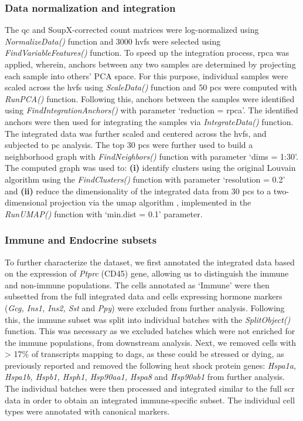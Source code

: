 \subsubsection{\large Data normalization and integration}
The \gls{qc} and SoupX-corrected count matrices were log-normalized using \textit{NormalizeData()} function and 3000 \glspl{hvf} were selected using \textit{FindVariableFeatures()} function. To speed up the integration process, \gls{rpca} was applied, wherein, anchors between any two samples are determined by projecting each sample into others’ PCA space. For this purpose, individual samples were scaled across the \glspl{hvf} using \textit{ScaleData()} function and 50 \glspl{pc} were computed with \textit{RunPCA()} function. Following this, anchors between the samples were identified using \textit{FindIntegrationAnchors()} with parameter `reduction = rpca’. The identified anchors were then used for integrating the samples via \textit{IntegrateData()} function. The integrated data was further scaled and centered across the \glspl{hvf}, and subjected to \gls{pc} analysis. The top 30 \glspl{pc} were further used to build a neighborhood graph with \textit{FindNeighbors()} function with parameter `dims = 1:30'. The computed graph was used to: \textbf{(i)} identify clusters using the original Louvain algorithm \textbf{\cite{blondel_fast_2008}} using the \textit{FindClusters()} function with parameter `resolution = 0.2' and \textbf{(ii)} reduce the dimensionality of the integrated data from 30 \glspl{pc} to a two-dimensional projection via the \gls{umap} algorithm \textbf{\cite{mcinnes_umap_2018}}, implemented in the \textit{RunUMAP()} function with `min.dist = 0.1' parameter.  


\subsubsection{\large Immune and Endocrine subsets}
\label{subsubsec:met_chp2_immuneendo}

\par To further characterize the dataset, we first annotated the integrated data based on the expression of \textit{Ptprc} (CD45) gene, allowing us to distinguish the immune and non-immune populations. The cells annotated as `Immune' were then subsetted from the full integrated data and cells expressing hormone markers (\textit{Gcg, Ins1, Ins2, Sst} and \textit{Ppy}) were excluded from further analysis. Following this, the immune subset was split into individual batches with the \textit{SplitObject()} function. This was necessary as we excluded batches which were not enriched for the immune populations, from downstream analysis. Next, we removed cells with > 17\% of transcripts mapping to \glspl{dag}, as these could be stressed or dying, as previously reported \textbf{\cite{oflanagan_dissociation_2019}} and removed the following heat shock protein genes: \textit{Hspa1a, Hspa1b, Hspb1, Hsph1, Hsp90aa1, Hspa8} and \textit{Hsp90ab1} from further analysis. The individual batches were then processed and integrated similar to the full \gls{scr} data in order to obtain an integrated immune-specific subset. The individual cell types were annotated with canonical markers.\\

